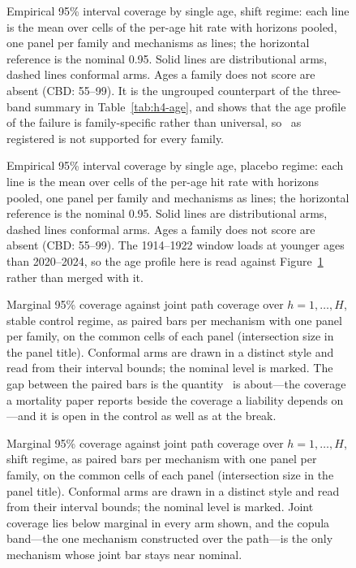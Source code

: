 \begin{figure}[htbp]\centering
{}
\caption{Empirical 95\% interval coverage by single age, shift regime: each
line is the mean over cells of the per-age hit rate with horizons pooled, one
panel per family and mechanisms as lines; the horizontal reference is the
nominal 0.95. Solid lines are distributional arms, dashed lines conformal arms.
Ages a family does not score are absent (CBD: 55--99). It is the ungrouped
counterpart of the three-band summary in Table~\ref{tab:h4-age}, and shows that
the age profile of the failure is family-specific rather than universal, so
\Hfour\ as registered is not supported for every family.}
\label{fig:coverage-by-age-shift}
\end{figure}
\clearpage

\begin{figure}[htbp]\centering
{}
\caption{Empirical 95\% interval coverage by single age, placebo regime: each
line is the mean over cells of the per-age hit rate with horizons pooled, one
panel per family and mechanisms as lines; the horizontal reference is the
nominal 0.95. Solid lines are distributional arms, dashed lines conformal arms.
Ages a family does not score are absent (CBD: 55--99). The 1914--1922 window
loads at younger ages than 2020--2024, so the age profile here is read against
Figure~\ref{fig:coverage-by-age-shift} rather than merged with it.}
\label{fig:coverage-by-age-placebo}
\end{figure}
\clearpage

\begin{figure}[htbp]\centering
{}
\caption{Marginal 95\% coverage against joint path coverage over
$h=1,\dots,H$, stable control regime, as paired bars per mechanism with one
panel per family, on the common cells of each panel (intersection size in the
panel title). Conformal arms are drawn in a distinct style and read from their
interval bounds; the nominal level is marked. The gap between the paired bars
is the quantity \Hthree\ is about---the coverage a mortality paper reports
beside the coverage a liability depends on---and it is open in the control as
well as at the break.}
\label{fig:joint-vs-marginal-stable}
\end{figure}
\clearpage

\begin{figure}[htbp]\centering
{}
\caption{Marginal 95\% coverage against joint path coverage over
$h=1,\dots,H$, shift regime, as paired bars per mechanism with one panel per
family, on the common cells of each panel (intersection size in the panel
title). Conformal arms are drawn in a distinct style and read from their
interval bounds; the nominal level is marked. Joint coverage lies below
marginal in every arm shown, and the copula band---the one mechanism
constructed over the path---is the only mechanism whose joint bar stays near
nominal.}
\label{fig:joint-vs-marginal-shift}
\end{figure}
\clearpage


